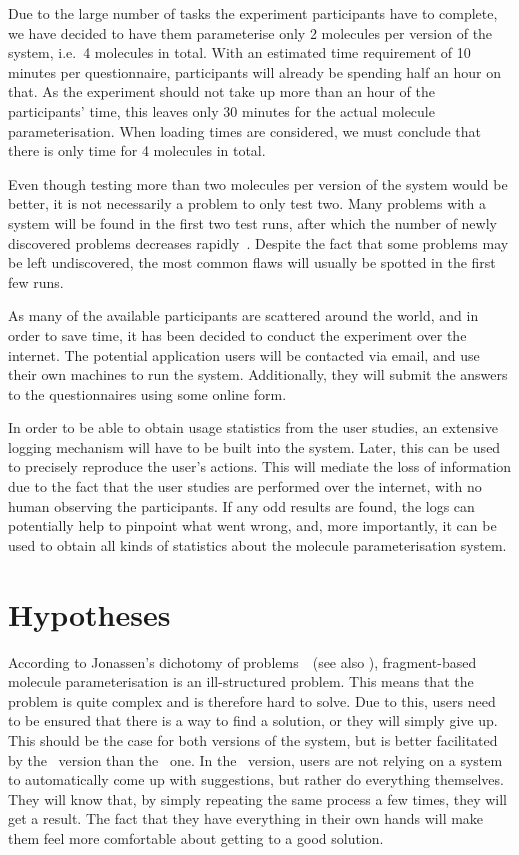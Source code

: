 Due to the large number of tasks the experiment participants have to complete, we have decided to have them parameterise only 2 molecules per version of the system, i.e.\ 4 molecules in total. With an estimated time requirement of 10 minutes per questionnaire, participants will already be spending half an hour on that. As the experiment should not take up more than an hour of the participants' time, this leaves only 30 minutes for the actual molecule parameterisation. When loading times are considered, we must conclude that there is only time for 4 molecules in total.

Even though testing more than two molecules per version of the system would be better, it is not necessarily a problem to only test two. Many problems with a system will be found in the first two test runs, after which the number of newly discovered problems decreases rapidly~\cite{krug2006dont, nielsen2000you}. Despite the fact that some problems may be left undiscovered, the most common flaws will usually be spotted in the first few runs.

As many of the available participants are scattered around the world, and in order to save time, it has been decided to conduct the experiment over the internet. The potential application users will be contacted via email, and use their own machines to run the system. Additionally, they will submit the answers to the questionnaires using some online form.

In order to be able to obtain usage statistics from the user studies, an extensive logging mechanism will have to be built into the system. Later, this can be used to precisely reproduce the user's actions. This will mediate the loss of information due to the fact that the user studies are performed over the internet, with no human observing the participants. If any odd results are found, the logs can potentially help to pinpoint what went wrong, and, more importantly, it can be used to obtain all kinds of statistics about the molecule parameterisation system.



\section{Hypotheses}
According to Jonassen's dichotomy of problems~\cite{jonassen2000toward}~(see also ), fragment-based molecule parameterisation is an ill-structured problem. This means that the problem is quite complex and is therefore hard to solve. Due to this, users need to be ensured that there is a way to find a solution, or they will simply give up. This should be the case for both versions of the system, but is better facilitated by the \IDa\ version than the \IDb\ one. In the \IDa\ version, users are not relying on a system to automatically come up with suggestions, but rather do everything themselves. They will know that, by simply repeating the same process a few times, they will get a result. The fact that they have everything in their own hands will make them feel more comfortable about getting to a good solution.

